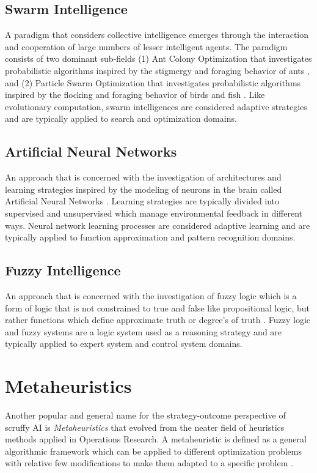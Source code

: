 \documentclass[a4paper, 11pt]{article}
\begin{document}
\subsection{Swarm Intelligence} 
A paradigm that considers collective intelligence emerges through the interaction and cooperation of large numbers of lesser intelligent agents. The paradigm consists of two dominant sub-fields (1) Ant Colony Optimization that investigates probabilistic algorithms inspired by the stigmergy and foraging behavior of ants \cite{Bonabeau1999, Dorigo2004}, and (2) Particle Swarm Optimization that investigates probabilistic algorithms inspired by the flocking and foraging behavior of birds and fish \cite{Shi2001}. Like evolutionary computation, swarm intelligences are considered adaptive strategies and are typically applied to search and optimization domains.

\subsection{Artificial Neural Networks}
An approach that is concerned with the investigation of architectures and learning strategies inspired by the modeling of neurons in the brain called Artificial Neural Networks \cite{Bishop1995}. Learning strategies are typically divided into supervised and unsupervised which manage environmental feedback in different ways. Neural network learning processes are considered adaptive learning and are typically applied to function approximation and pattern recognition domains.

\subsection{Fuzzy Intelligence}
An approach that is concerned with the investigation of fuzzy logic which is a form of logic that is not constrained to true and false like propositional logic, but rather functions which define approximate truth or degree’s of truth \cite{Zadeh1996}. Fuzzy logic and fuzzy systems are a logic system used as a reasoning strategy and are typically applied to expert system and control system domains.

% 
% 
\section{Metaheuristics}
\label{sec:metaheuristics}
Another popular and general name for the strategy-outcome perspective of scruffy AI is \emph{Metaheuristics} that evolved from the neater field of heuristics methods applied in Operations Research. A metaheuristic is defined as a general algorithmic framework which can be applied to different optimization problems with relative few modifications to make them adapted to a specific problem \cite{Blum2003}. 
\end{document}
